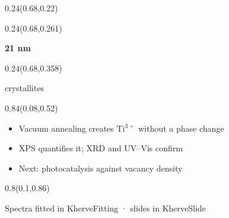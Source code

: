 \documentclass[aspectratio=169]{beamer}
\begin{document}
\begin{frame}[t]
%
\begin{textblock}{0.24}(0.68,0.22)
\end{textblock}

\begin{textblock}{0.24}(0.68,0.261)
{\centering\fontsize{26}{31}\selectfont \textcolor[HTML]{FFFFFF}{\textbf{21 nm}}\par}
\end{textblock}

\begin{textblock}{0.24}(0.68,0.358)
{\centering\fontsize{12}{14}\selectfont \textcolor[HTML]{FFFFFF}{crystallites}\par}
\end{textblock}

\begin{textblock}{0.84}(0.08,0.52)
{\raggedright\fontsize{16}{19}\selectfont \begin{itemize}
\item Vacuum annealing creates Ti$^{3+}$ without a phase change
\item XPS quantifies it; XRD and UV–Vis confirm
\item Next: photocatalysis against vacancy density
\end{itemize}\par}
\end{textblock}

\begin{textblock}{0.8}(0.1,0.86)
{\centering\fontsize{10}{12}\selectfont \textcolor[HTML]{777777}{Spectra fitted in KherveFitting  ·  slides in KherveSlide}\par}
\end{textblock}
\end{frame}
\end{document}
